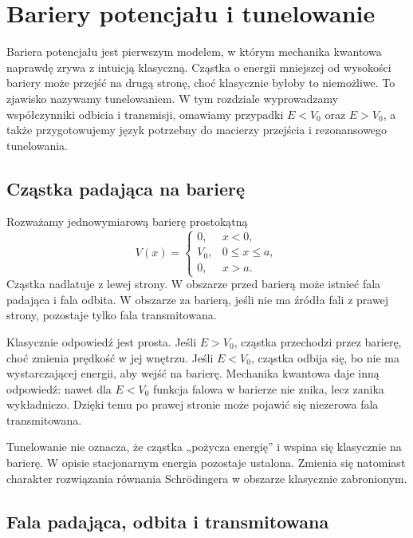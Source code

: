 \chapter{Bariery potencjału i tunelowanie}

\begin{summarybox}
Bariera potencjału jest pierwszym modelem, w którym mechanika kwantowa naprawdę
zrywa z intuicją klasyczną. Cząstka o energii mniejszej od wysokości bariery
może przejść na drugą stronę, choć klasycznie byłoby to niemożliwe. To zjawisko
nazywamy tunelowaniem. W tym rozdziale wyprowadzamy współczynniki odbicia i
transmisji, omawiamy przypadki \(E<V_0\) oraz \(E>V_0\), a także przygotowujemy
język potrzebny do macierzy przejścia i rezonansowego tunelowania.
\end{summarybox}

\section{Cząstka padająca na barierę}

Rozważamy jednowymiarową barierę prostokątną
\[
V(x)=
\begin{cases}
0, & x<0,\\
V_0, & 0\leq x\leq a,\\
0, & x>a.
\end{cases}
\]
Cząstka nadlatuje z lewej strony. W obszarze przed barierą może istnieć fala padająca i fala odbita. W obszarze za barierą, jeśli nie ma źródła fali z prawej strony, pozostaje tylko fala transmitowana.

Klasycznie odpowiedź jest prosta. Jeśli \(E>V_0\), cząstka przechodzi przez barierę, choć zmienia prędkość w jej wnętrzu. Jeśli \(E<V_0\), cząstka odbija się, bo nie ma wystarczającej energii, aby wejść na barierę. Mechanika kwantowa daje inną odpowiedź: nawet dla \(E<V_0\) funkcja falowa w barierze nie znika, lecz zanika wykładniczo. Dzięki temu po prawej stronie może pojawić się niezerowa fala transmitowana.

\begin{remarkbox}
Tunelowanie nie oznacza, że cząstka „pożycza energię” i wspina się klasycznie na barierę. W opisie stacjonarnym energia pozostaje ustalona. Zmienia się natomiast charakter rozwiązania równania Schrödingera w obszarze klasycznie zabronionym.
\end{remarkbox}

\section{Fala padająca, odbita i transmitowana}

